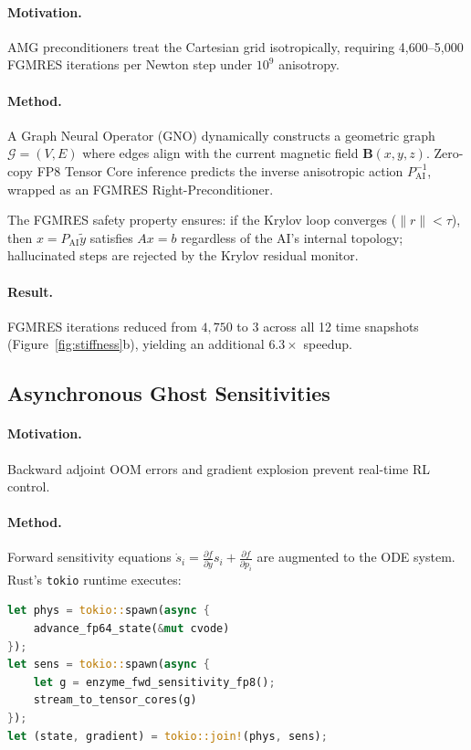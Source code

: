 \documentclass[11pt,twocolumn]{article}
\begin{document}
\paragraph{Motivation.} AMG preconditioners treat the Cartesian grid
isotropically, requiring 4,600--5,000 FGMRES iterations per Newton step
under $10^9$ anisotropy.

\paragraph{Method.} A Graph Neural Operator (GNO) dynamically constructs
a geometric graph $\mathcal{G}=(V,E)$ where edges align with the current
magnetic field $\mathbf{B}(x,y,z)$. Zero-copy FP8 Tensor Core inference
predicts the inverse anisotropic action $P_{\mathrm{AI}}^{-1}$, wrapped
as an FGMRES Right-Preconditioner.

The FGMRES safety property ensures: if the Krylov loop converges
($\|r\| < \tau$), then $x = P_{\mathrm{AI}}\tilde{y}$ satisfies $Ax=b$
regardless of the AI's internal topology; hallucinated steps are rejected
by the Krylov residual monitor.

\paragraph{Result.} FGMRES iterations reduced from $4{,}750$ to $3$
across all 12 time snapshots (Figure~\ref{fig:stiffness}b),
yielding an additional $\mathbf{6.3\times}$ speedup.

\subsection{Asynchronous Ghost Sensitivities}
\label{sec:ghost}

\paragraph{Motivation.} Backward adjoint OOM errors and gradient explosion
prevent real-time RL control.

\paragraph{Method.} Forward sensitivity equations
$\dot{s}_i = \frac{\partial f}{\partial y}s_i + \frac{\partial f}{\partial p_i}$
are augmented to the ODE system. Rust's \texttt{tokio} runtime executes:

\begin{lstlisting}[language=Rust,caption={Concurrent FP64/FP8 execution}]
let phys = tokio::spawn(async {
    advance_fp64_state(&mut cvode)
});
let sens = tokio::spawn(async {
    let g = enzyme_fwd_sensitivity_fp8();
    stream_to_tensor_cores(g)
});
let (state, gradient) = tokio::join!(phys, sens);
\end{lstlisting}
\end{document}
